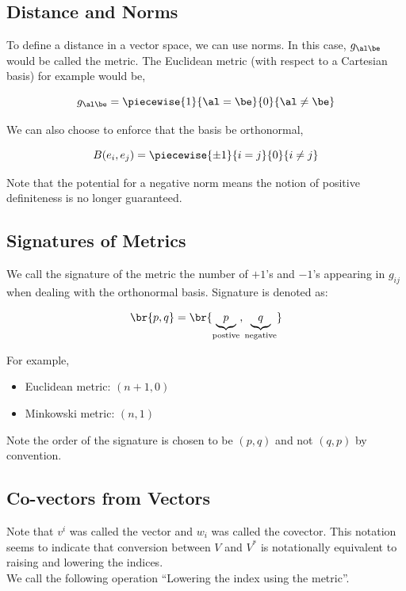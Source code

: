 \documentclass{article}
\begin{document}
\subsection{Distance and Norms}

To define a distance in a vector space, we can use norms. In this case, $g_{\al\be}$ would be called the metric. The Euclidean metric (with respect to a Cartesian basis) for example would be,

\[ g_{\al\be} = \piecewise{1}{\al = \be}{0}{\al \neq \be}  \]

We can also choose to enforce that the basis be orthonormal,

\[ B(e_i, e_j) = \piecewise{\pm1}{i = j}{0}{i \neq j} \]

Note that the potential for a negative norm means the notion of positive definiteness is no longer guaranteed.

\subsection{Signatures of Metrics}

We call the signature of the metric the number of $+1$'s and $-1$'s appearing in $g_{ij}$ when dealing with the orthonormal basis. Signature is denoted as:

\[ \br{p, q} = \br{\underbrace{p}_{\text{postive}}, \underbrace{q}_{\text{negative}}} \]

For example,

\begin{itemize}
    \item Euclidean metric: $(n+1, 0)$
    \item Minkowski metric: $(n, 1)$
\end{itemize}

Note the order of the signature is chosen to be $(p,q)$ and not $(q, p)$ by convention.

\subsection{Co-vectors from Vectors}

Note that $v^i$ was called the vector and $w_i$ was called the covector. This notation seems to indicate that conversion between $V$ and $V^*$ is notationally equivalent to raising and lowering the indices. \\

We call the following operation ``Lowering the index using the metric''.
\end{document}
